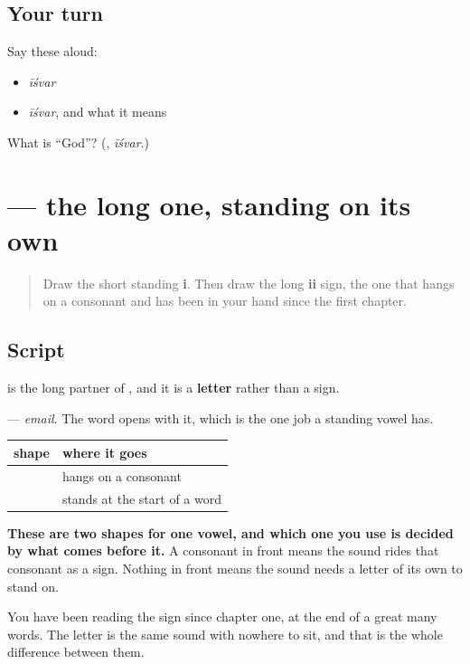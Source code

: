 \subsection*{Your turn}
Say these aloud:

\begin{itemize}
\raggedright
  \item \emph{īśvar}
  \item \emph{īśvar}, and what it means
\end{itemize}

\begin{tcolorbox}[breakable,colback=teal!4,colframe=teal!35!black,title={Before you move on}]
What is \textquotedblleft{}God\textquotedblright{}? (\textbf{}, \emph{īśvar}.)
\end{tcolorbox}
\section[\texorpdfstring{\mr{ई} (ii)}{ई (ii)}]{ — the long one, standing on its own}

\label{lesson:MR-W65-ii-independent}



\begin{quote}
Draw the short standing \textbf{i}. Then draw the long \textbf{ii} sign, the one that hangs on a consonant and has been in your hand since the first chapter.
\end{quote}

\subsection*{Script}
\begin{quote}
\end{quote}

\textbf{} is the long partner of \textbf{}, and it is a \textbf{letter} rather than a sign.

\textbf{} — \emph{email}. The word opens with it, which is the one job a standing vowel has.

\begin{grammarlens}[title={Grammar Lens: the sign rides, the letter stands}]
\noindent
\begin{tabularx}{\linewidth}{@{}>{\raggedright\arraybackslash}X>{\raggedright\arraybackslash}X@{}}
\toprule
\textbf{shape} & \textbf{where it goes} \\
\midrule
\mr{◌ी} & hangs on a consonant \\
\mr{ई} & stands at the start of a word \\
\bottomrule
\end{tabularx}

\textbf{These are two shapes for one vowel, and which one you use is decided by what comes before it.} A consonant in front means the sound rides that consonant as a sign. Nothing in front means the sound needs a letter of its own to stand on.

You have been reading the sign since chapter one, at the end of a great many words. The letter is the same sound with nowhere to sit, and that is the whole difference between them.
\end{grammarlens}

